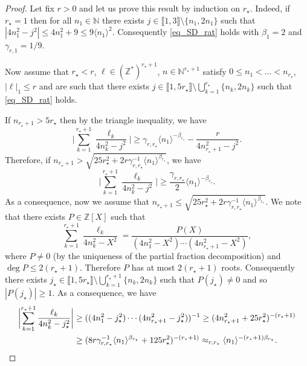 \documentclass[JEP,XML,SOM,Unicode,NoEqCountersInSection,published]{cedram}
\theoremstyle{definition}
\begin{document}
\begin{proof} Let fix $r>0$ and let us prove this result by induction on $r_\star$. Indeed, if~$r_\star = 1$ then for all $n_1\in \mathbb{N}$ there exists $j\in \llbracket 1,3 \rrbracket \setminus \{n_1,2n_1\}$ such that $|4n_1^2-j^2 |\leq 4 n_1^2 + 9 \leq 9 \langle n_1 \rangle^2$. Consequently \eqref{eq_SD_rat} holds with $\beta_1=2$ and $\gamma_{r,1} = 1/9$.

Now assume that $r_\star < r$, $\ell \in (\mathbb{Z}^*)^{r_\star+1}$, $n \in \mathbb{N}^{r_\star+1}$ satisfy $0\leq n_1 < \dots < n_{r_\star}$, $|\ell|_1\leq r$ and are such that there exists $j\in \llbracket 1,5r_\star \rrbracket \setminus \bigcup_{k=1}^{r_\star}\{ n_k,2n_k\}$ such that \eqref{eq_SD_rat} holds.

If $n_{r_\star+1}> 5 r_\star$ then by the triangle inequality, we have
\[
\biggl| \sum_{k=1}^{r_\star+1} \frac{\ell_k}{4n_k^2-j^2} \biggr| \geq \gamma_{r,r_\star} \langle n_1 \rangle^{-\beta_{r_\star}} - \frac{r}{4n_{r_\star+1}^2-j^2}.
\]
Therefore, if $n_{r_\star+1} > \sqrt{25r_\star^2 +2r \gamma_{r,r_\star}^{-1} \langle n_1 \rangle^{\beta_{r_\star}} }$, we have
\[
\biggl| \sum_{k=1}^{r_\star+1} \frac{\ell_k}{4n_k^2-j^2} \biggr| \geq \frac{\gamma_{r,r_\star}}2 \langle n_1 \rangle^{-\beta_{r_\star}}.
\]
As a consequence, now we assume that $n_{r_\star+1} \leq \sqrt{25r_\star^2 +2r \gamma_{r,r_\star}^{-1} \langle n_1 \rangle^{\beta_{r_\star}} }$. We note that there exists $P\in \mathbb{Z}[X]$ such that
\[
\sum_{k=1}^{r_\star+1} \frac{\ell_k}{4n_k^2-X^2} = \frac{P(X)}{(4n_1^2-X^2) \cdots (4n_{r_\star+1}^2-X^2) },
\]
where $P\neq 0$ (by the uniqueness of the partial fraction decomposition) and $\deg P \leq 2 (r_\star +1)$. Therefore $P$ has at most $2 (r_\star +1)$ roots. Consequently there exists $j_\star\in \llbracket 1,5r_\star \rrbracket \setminus \bigcup_{k=1}^{r_\star+1}\{ n_k,2n_k\}$ such that $P(j_\star) \neq 0$ and so $|P(j_\star)|\geq 1$. As a consequence, we have
\begin{align*}
\biggl| \sum_{k=1}^{r_\star+1} \frac{\ell_k}{4n_k^2-j_\star^2} \biggr| &\geq ((4n_1^2-j_\star^2) \cdots (4n_{r_\star+1}^2-j_\star^2))^{-1} \geq (4n_{r_\star+1}^2+25r_\star^2)^{-(r_\star+1)} \\
&\geq (8r \gamma_{r,r_\star}^{-1} \langle n_1 \rangle^{\beta_{r_\star}}+125r_\star^2)^{-(r_\star+1)} \approx_{r,r_\star} \langle n_1 \rangle^{ -(r_\star+1) \beta_{r_\star}}.\qedhere
\end{align*}
\end{proof}
\end{document}
